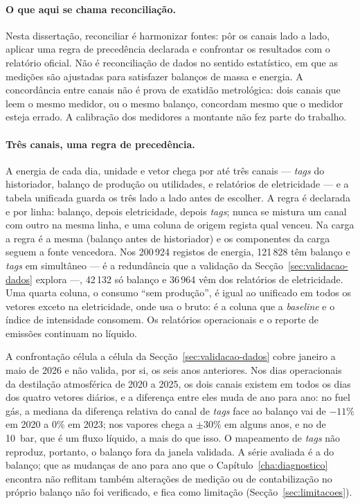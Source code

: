 \paragraph{O que aqui se chama reconciliação.} Nesta dissertação,
reconciliar é harmonizar fontes: pôr os canais lado a lado, aplicar uma
regra de precedência declarada e confrontar os resultados com o relatório
oficial. Não é reconciliação de dados no sentido estatístico, em que as
medições são ajustadas para satisfazer balanços de massa e energia.
 A concordância entre canais não é prova de exatidão
metrológica: dois canais
que leem o mesmo medidor, ou o mesmo balanço, concordam mesmo que o medidor
esteja errado. A calibração dos medidores a montante não fez parte do
trabalho.

\paragraph{Três canais, uma regra de precedência.} A energia de cada
dia, unidade e vetor chega por até três canais --- \emph{tags} do
historiador, balanço de produção ou utilidades, e relatórios de
eletricidade --- e a tabela unificada guarda os três lado a lado antes de
escolher. A regra é declarada e por linha: balanço, depois eletricidade,
depois \emph{tags}; nunca se mistura um canal com outro na mesma linha, e
uma coluna de origem regista qual venceu. Na carga a regra é a mesma
(balanço antes de historiador) e os componentes da carga seguem a fonte
vencedora. Nos 200\,924 registos de energia, 121\,828 têm balanço e
\emph{tags} em simultâneo --- é a redundância que a validação da
Secção~\ref{sec:validacao-dados} explora ---, 42\,132 só balanço e 36\,964
vêm dos relatórios de eletricidade. Uma quarta coluna, o consumo ``sem
produção'', é igual ao unificado em todos os vetores exceto na
eletricidade, onde usa o bruto: é a coluna que a \emph{baseline} e o índice
de intensidade consomem. Os relatórios operacionais e o reporte de
emissões continuam no líquido.

A confrontação célula a célula da Secção~\ref{sec:validacao-dados} cobre
janeiro a maio de 2026 e não valida, por si, os seis anos anteriores. Nos
dias operacionais da destilação atmosférica de 2020 a 2025, os dois canais
existem em todos os dias dos quatro vetores diários, e a diferença entre
eles muda de ano para ano: no fuel gás, a mediana da diferença relativa do
canal de \emph{tags} face ao balanço vai de $-11\%$ em 2020 a $0\%$ em 2023;
nos vapores chega a $\pm30\%$ em alguns anos, e no de 10~bar, que é um fluxo
líquido, a mais do que isso. O mapeamento de \emph{tags} não reproduz, portanto,
o balanço fora da janela validada. A série avaliada é a do balanço; que as
mudanças de ano para ano que o Capítulo~\ref{cha:diagnostico} encontra não
reflitam também alterações de medição ou de contabilização no próprio
balanço não foi verificado, e fica como limitação
(Secção~\ref{sec:limitacoes}).

